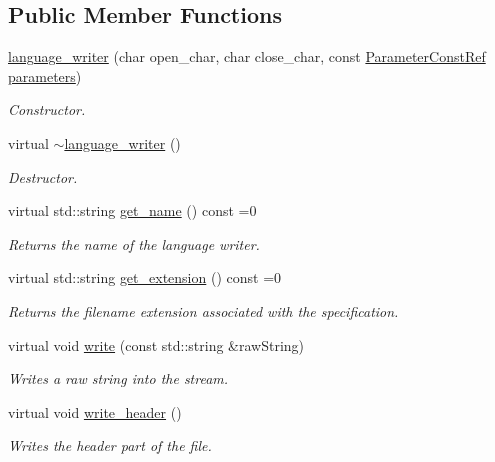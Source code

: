 \subsection*{Public Member Functions}
\begin{DoxyCompactItemize}
\item 
\hyperlink{classlanguage__writer_a9eb0746b5252aea753ed97772a58d274}{language\+\_\+writer} (char open\+\_\+char, char close\+\_\+char, const \hyperlink{Parameter_8hpp_a37841774a6fcb479b597fdf8955eb4ea}{Parameter\+Const\+Ref} \hyperlink{classlanguage__writer_aeb717c1d12571e3808759009be752d59}{parameters})
\begin{DoxyCompactList}\small\item\em Constructor. \end{DoxyCompactList}\item 
virtual \hyperlink{classlanguage__writer_ae8acf0e28cb5fcd69ef12a32dc019232}{$\sim$language\+\_\+writer} ()
\begin{DoxyCompactList}\small\item\em Destructor. \end{DoxyCompactList}\item 
virtual std\+::string \hyperlink{classlanguage__writer_a6eabf4ff2972e00a392a0d2a8b4c5a3a}{get\+\_\+name} () const =0
\begin{DoxyCompactList}\small\item\em Returns the name of the language writer. \end{DoxyCompactList}\item 
virtual std\+::string \hyperlink{classlanguage__writer_a3bcb9c84b283d53ecc1f3c4ee8e9dc38}{get\+\_\+extension} () const =0
\begin{DoxyCompactList}\small\item\em Returns the filename extension associated with the specification. \end{DoxyCompactList}\item 
virtual void \hyperlink{classlanguage__writer_a17a157a423c319a75b20ed1eb8bb6f6e}{write} (const std\+::string \&raw\+String)
\begin{DoxyCompactList}\small\item\em Writes a raw string into the stream. \end{DoxyCompactList}\item 
virtual void \hyperlink{classlanguage__writer_a3e96d627983817f9b84f72cc1fa8bb4f}{write\+\_\+header} ()
\begin{DoxyCompactList}\small\item\em Writes the header part of the file. \end{DoxyCompactList}\item 

\end{DoxyCompactItemize}
